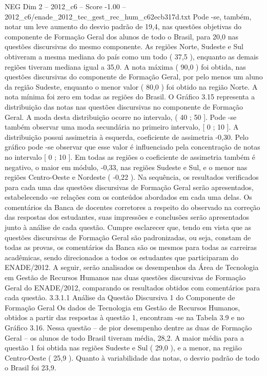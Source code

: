 \begin{textsample}{NEG Dim 2 – 2012\_c6 – Score -1.00 – 2012\_c6/enade\_2012\_tec\_gest\_rec\_hum\_c62ecb317d.txt}
Pode -se, também, notar um leve aumento do desvio padrão de 19,4, nas questões objetivas do componente de Formação Geral dos alunos de todo o Brasil, para 20,0 nas questões discursivas do mesmo componente.
As regiões Norte, Sudeste e Sul obtiveram a mesma mediana do país como um todo ( 37,5 ), enquanto as demais regiões tiveram mediana igual a 35,0.
A nota máxima ( 90,0 ) foi obtida, nas questões discursivas do componente de Formação Geral, por pelo menos um aluno da região Sudeste, enquanto o menor valor ( 80,0 ) foi obtido na região Norte.
A nota mínima foi zero em todas as regiões do Brasil.
O Gráfico 3.15 representa a distribuição das notas nas questões discursivas no componente de Formação Geral.
A moda desta distribuição ocorre no intervalo, ( 40 ; 50 ].
Pode -se também observar uma moda secundária no primeiro intervalo, [ 0 ; 10 ].
A distribuição possui assimetria à esquerda, coeficiente de assimetria -0,30.
Pelo gráfico pode -se observar que esse valor é influenciado pela concentração de notas no intervalo [ 0 ; 10 ].
Em todas as regiões o coeficiente de assimetria também é negativo, o maior em módulo, -0,33, nas regiões Sudeste e Sul, e o menor nas regiões Centro-Oeste e Nordeste ( -0,22 ).
Na sequência, os resultados verificados para cada uma das questões discursivas de Formação Geral serão apresentados, estabelecendo -se relações com os conteúdos abordados em cada uma delas.
Os comentários da Banca de docentes corretores a respeito do observado na correção das respostas dos estudantes, suas impressões e conclusões serão apresentados junto à análise de cada questão.
Cumpre esclarecer que, tendo em vista que as questões discursivas de Formação Geral são padronizadas, ou seja, constam de todas as provas, os comentários da Banca são os mesmos para todas as carreiras acadêmicas, sendo direcionados a todos os estudantes que participaram do ENADE/2012.
A seguir, serão analisados os desempenhos da Área de Tecnologia em Gestão de Recursos Humanos nas duas questões discursivas de Formação Geral do ENADE/2012, comparando os resultados obtidos com comentários para cada questão. 3.3.1.1 Análise da Questão Discursiva 1 do Componente de Formação Geral Os dados de Tecnologia em Gestão de Recursos Humanos, obtidos a partir das respostas à questão 1, encontram -se na Tabela 3.9 e no Gráfico 3.16.
Nessa questão – de pior desempenho dentre as duas de Formação Geral – os alunos de todo Brasil tiveram média, 28,2.
A maior média para a questão 1 foi obtida nas regiões Sudeste e Sul ( 29,0 ), e a menor, na região Centro-Oeste ( 25,9 ).
Quanto à variabilidade das notas, o desvio padrão de todo o Brasil foi 23,9.

\end{textsample}
